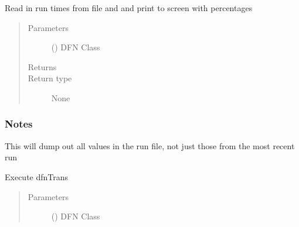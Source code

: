 \documentclass[letterpaper,10pt,english]{sphinxmanual}
\begin{document}
\begin{fulllineitems}
\begin{fulllineitems}
\label{\detokenize{pydfnworks:pydfnworks.general.dfnworks.DFNWORKS.print_run_time}}
Read in run times from file and and print to screen with percentages
\begin{quote}\begin{description}
\item[{Parameters}] \leavevmode
{} () \textendash{} DFN Class

\item[{Returns}] \leavevmode


\item[{Return type}] \leavevmode
None

\end{description}\end{quote}
\subsubsection*{Notes}

This will dump out all values in the run file, not just those from the most recent run

\end{fulllineitems}


\begin{fulllineitems}
\label{\detokenize{pydfnworks:pydfnworks.general.dfnworks.DFNWORKS.pydfnworks}}
\end{fulllineitems}


\begin{fulllineitems}
\label{\detokenize{pydfnworks:pydfnworks.general.dfnworks.DFNWORKS.run_dfn_trans}}
Execute dfnTrans
\begin{quote}\begin{description}
\item[{Parameters}] \leavevmode
{} () \textendash{} DFN Class


\end{description}
\end{quote}
\end{fulllineitems}
\end{fulllineitems}
\end{document}
